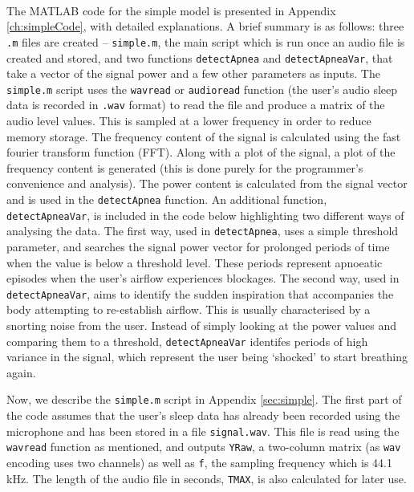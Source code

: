 The MATLAB\textsuperscript{\textregistered{}} code for the simple model is presented in Appendix \ref{ch:simpleCode}, with detailed explanations. A brief summary is as follows: three \verb!.m! files are created -- \verb!simple.m!, the main script which is run once an audio file is created and stored, and two functions \verb!detectApnea! and \verb!detectApneaVar!, that take a vector of the signal power and a few other parameters as inputs. The \verb!simple.m! script uses the \verb!wavread! or \verb!audioread! function (the user's audio sleep data is recorded in \verb!.wav! format) to read the file and produce a matrix of the audio level values. This is sampled at a lower frequency in order to reduce memory storage. The frequency content of the signal is calculated using the fast fourier transform function (FFT). Along with a plot of the signal, a plot of the frequency content is generated (this is done purely for the programmer's convenience and analysis). The power content is calculated from the signal vector and is used in the \verb!detectApnea! function. An additional function, \verb!detectApneaVar!, is included in the code below highlighting two different ways of analysing the data. The first way, used in \verb!detectApnea!, uses a simple threshold parameter, and searches the signal power vector for prolonged periods of time when the value is below a threshold level. These periods represent apnoeatic episodes when the user's airflow experiences blockages. The second way, used in \verb!detectApneaVar!, aims to identify the sudden inspiration that accompanies the body attempting to re-establish airflow. This is usually characterised by a snorting noise from the user. Instead of simply looking at the power values and comparing them to a threshold, \verb!detectApneaVar! identifes periods of high variance in the signal, which represent the user being `shocked' to start breathing again.

Now, we describe the \verb!simple.m! script in Appendix \ref{sec:simple}. The first part of the code assumes that the user's sleep data has already been recorded using the microphone and has been stored in a file \verb!signal.wav!. This file is read using the \verb!wavread! function as mentioned, and outputs \verb!YRaw!, a two-column matrix (as \verb!wav! encoding uses two channels) as well as \verb!f!, the sampling frequency which is 44.1 kHz. The length of the audio file in seconds, \verb!TMAX!, is also calculated for later use.

